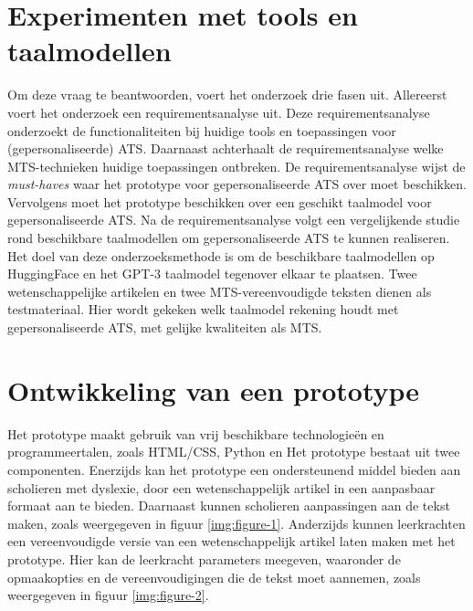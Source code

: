 \documentclass[a0,portrait]{hogent-poster}
\begin{document}
\begin{multicols}{2}
\section{Experimenten met tools en taalmodellen}

Om deze vraag te beantwoorden, voert het onderzoek drie fasen uit. Allereerst voert het onderzoek een requirementsanalyse uit. Deze requirementsanalyse onderzoekt de functionaliteiten bij huidige tools en toepassingen voor (gepersonaliseerde) ATS. Daarnaast achterhaalt de requirementsanalyse welke MTS-technieken huidige toepassingen ontbreken. De requirementsanalyse wijst de \textit{must-haves} waar het prototype voor gepersonaliseerde ATS over moet beschikken. Vervolgens moet het prototype beschikken over een geschikt taalmodel voor gepersonaliseerde ATS. Na de requirementsanalyse volgt een vergelijkende studie rond beschikbare taalmodellen om gepersonaliseerde ATS te kunnen realiseren. Het doel van deze onderzoeksmethode is om de beschikbare taalmodellen op HuggingFace en het GPT-3 taalmodel tegenover elkaar te plaatsen. Twee wetenschappelijke artikelen en twee MTS-vereenvoudigde teksten dienen als testmateriaal. Hier wordt gekeken welk taalmodel rekening houdt met gepersonaliseerde ATS, met gelijke kwaliteiten als MTS.

\section{Ontwikkeling van een prototype}

Het prototype maakt gebruik van vrij beschikbare technologieën en programmeertalen, zoals HTML/CSS, Python en Het prototype bestaat uit twee componenten. Enerzijds kan het prototype een ondersteunend middel bieden aan scholieren met dyslexie, door een wetenschappelijk artikel in een aanpasbaar formaat aan te bieden. Daarnaast kunnen scholieren aanpassingen aan de tekst maken, zoals weergegeven in figuur \ref{img:figure-1}. Anderzijds kunnen leerkrachten een vereenvoudigde versie van een wetenschappelijk artikel laten maken met het prototype. Hier kan de leerkracht parameters meegeven, waaronder de opmaakopties en de vereenvoudigingen die de tekst moet aannemen, zoals weergegeven in figuur \ref{img:figure-2}.


\end{multicols}
\end{document}
